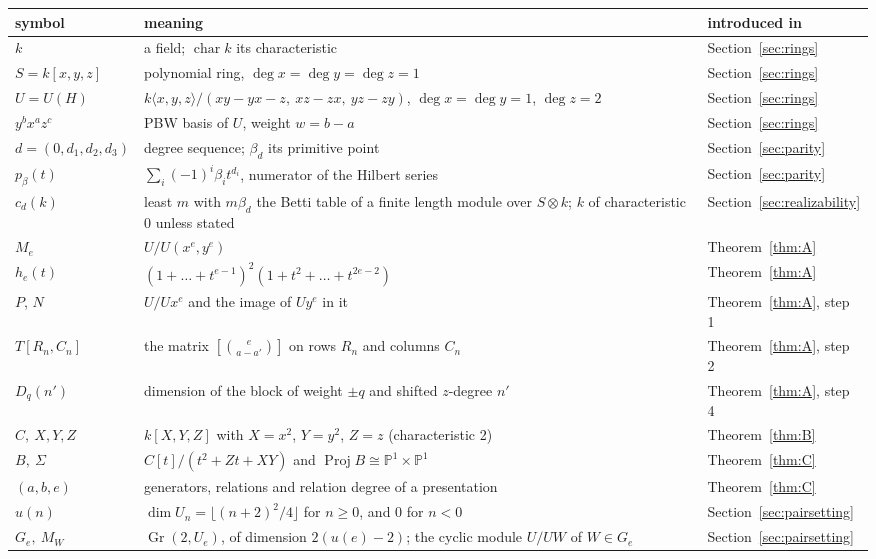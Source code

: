 \begin{tabular}{@{}>{\raggedright\arraybackslash}p{2.7cm}>{\raggedright\arraybackslash}p{9.2cm}l@{}}
\toprule
symbol & meaning & introduced in\\
\midrule
$k$ & a field; $\operatorname{char}k$ its characteristic & Section~\ref{sec:rings}\\
$S=k[x,y,z]$ & polynomial ring, $\deg x=\deg y=\deg z=1$ & Section~\ref{sec:rings}\\
$U=U(H)$ & $k\langle x,y,z\rangle/(xy-yx-z,\ xz-zx,\ yz-zy)$, $\deg x=\deg y=1$, $\deg z=2$ & Section~\ref{sec:rings}\\
$y^bx^az^c$ & PBW basis of $U$, weight $w=b-a$ & Section~\ref{sec:rings}\\
$d=(0,d_1,d_2,d_3)$ & degree sequence; $\beta_d$ its primitive point & Section~\ref{sec:parity}\\
$p_\beta(t)$ & $\sum_i(-1)^i\beta_it^{d_i}$, numerator of the Hilbert series & Section~\ref{sec:parity}\\
$c_d(k)$ & least $m$ with $m\beta_d$ the Betti table of a finite length module over $S\otimes k$; $k$ of characteristic 0 unless stated & Section~\ref{sec:realizability}\\
$M_e$ & $U/U(x^e,y^e)$ & Theorem~\ref{thm:A}\\
$h_e(t)$ & $(1+\dots+t^{e-1})^2(1+t^2+\dots+t^{2e-2})$ & Theorem~\ref{thm:A}\\
$P$, $N$ & $U/Ux^e$ and the image of $Uy^e$ in it & Theorem~\ref{thm:A}, step 1\\
$T[R_n,C_n]$ & the matrix $[\binom{e}{a-a'}]$ on rows $R_n$ and columns $C_n$ & Theorem~\ref{thm:A}, step 2\\
$D_q(n')$ & dimension of the block of weight $\pm q$ and shifted $z$-degree $n'$ & Theorem~\ref{thm:A}, step 4\\
$C,\ X,Y,Z$ & $k[X,Y,Z]$ with $X=x^2$, $Y=y^2$, $Z=z$ (characteristic 2) & Theorem~\ref{thm:B}\\
$B,\ \Sigma$ & $C[t]/(t^2+Zt+XY)$ and $\operatorname{Proj}B\cong\mathbb{P}^1\times\mathbb{P}^1$ & Theorem~\ref{thm:C}\\
$(a,b,e)$ & generators, relations and relation degree of a presentation & Theorem~\ref{thm:C}\\
$u(n)$ & $\dim U_n=\lfloor(n+2)^2/4\rfloor$ for $n\ge0$, and $0$ for $n<0$ & Section~\ref{sec:pairsetting}\\
$G_e,\ M_W$ & $\operatorname{Gr}(2,U_e)$, of dimension $2(u(e)-2)$; the cyclic module $U/UW$ of $W\in G_e$ & Section~\ref{sec:pairsetting}\\

\end{tabular}
